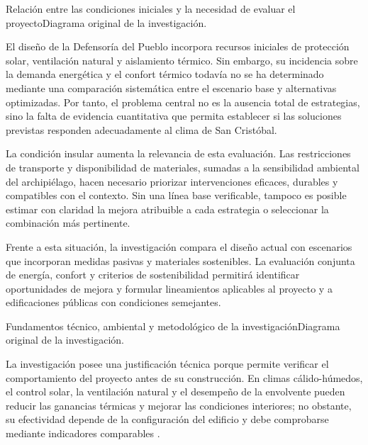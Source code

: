 \begin{landscape}
\begin{pilotoTextoGrafico}{\graficoProblemaIntro}{Relación entre las condiciones iniciales y la necesidad de evaluar el proyecto}{Diagrama original de la investigación.}

El diseño de la Defensoría del Pueblo incorpora recursos iniciales de protección solar, ventilación natural y aislamiento térmico. Sin embargo, su incidencia sobre la demanda energética y el confort térmico todavía no se ha determinado mediante una comparación sistemática entre el escenario base y alternativas optimizadas. Por tanto, el problema central no es la ausencia total de estrategias, sino la falta de evidencia cuantitativa que permita establecer si las soluciones previstas responden adecuadamente al clima de San Cristóbal.

La condición insular aumenta la relevancia de esta evaluación. Las restricciones de transporte y disponibilidad de materiales, sumadas a la sensibilidad ambiental del archipiélago, hacen necesario priorizar intervenciones eficaces, durables y compatibles con el contexto. Sin una línea base verificable, tampoco es posible estimar con claridad la mejora atribuible a cada estrategia o seleccionar la combinación más pertinente.

Frente a esta situación, la investigación compara el diseño actual con escenarios que incorporan medidas pasivas y materiales sostenibles. La evaluación conjunta de energía, confort y criterios de sostenibilidad permitirá identificar oportunidades de mejora y formular lineamientos aplicables al proyecto y a edificaciones públicas con condiciones semejantes.
\end{pilotoTextoGrafico}


\begin{pilotoTextoGrafico}{\graficoJustificacionIntro}{Fundamentos técnico, ambiental y metodológico de la investigación}{Diagrama original de la investigación.}

La investigación posee una justificación técnica porque permite verificar el comportamiento del proyecto antes de su construcción. En climas cálido-húmedos, el control solar, la ventilación natural y el desempeño de la envolvente pueden reducir las ganancias térmicas y mejorar las condiciones interiores; no obstante, su efectividad depende de la configuración del edificio y debe comprobarse mediante indicadores comparables \parencite{jegaImplicationShadingPassive2023,alhuwayilEnergyPerformancePassive2023}.


\end{pilotoTextoGrafico}
\end{landscape}
